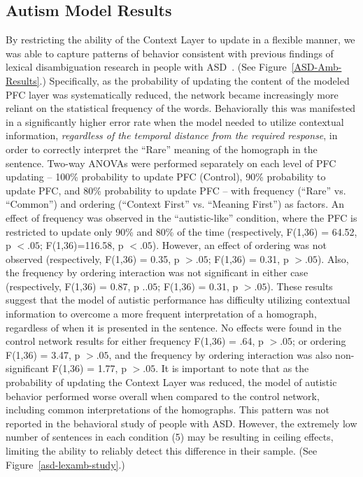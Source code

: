 \documentclass[man]{apa}
\begin{document}
\subsection{Autism Model Results}
By restricting the ability of the Context Layer to update in a flexible manner, we was able to capture patterns of behavior consistent with previous findings of lexical disambiguation research in people with ASD~\cite{RefWorks:103,HappeF:1997:WCC_Homographs}. (See Figure~\ref{ASD-Amb-Results}.) Specifically, as the probability of updating the content of the modeled PFC layer was systematically reduced, the network became increasingly more reliant on the statistical frequency of the words.  Behaviorally this was manifested in a significantly higher error rate when the model needed to utilize contextual information, \emph{regardless of the temporal distance from the required response}, in order to correctly interpret the ``Rare'' meaning of the homograph in the sentence.  Two-way ANOVAs were performed separately on each level of PFC updating  -- 100\% probability to update PFC (Control), 90\% probability to update PFC, and 80\% probability to update PFC -- with frequency (``Rare'' vs. ``Common'') and ordering (``Context First'' vs. ``Meaning First'') as factors.  An effect of frequency was observed in the ``autistic-like'' condition, where the PFC is restricted to update only 90\% and 80\% of the time (respectively, F(1,36) = 64.52, p $< .05$; F(1,36)=116.58, p $< .05$). However, an effect of ordering was not observed (respectively, F(1,36) = 0.35, p $> .05$; F(1,36) = 0.31, p $> .05$). Also, the frequency by ordering interaction was not significant in either case (respectively, F(1,36) = 0.87, p $. .05$; F(1,36) = 0.31, p $> .05$). These results suggest that the model of autistic performance has difficulty utilizing contextual information to overcome a more frequent interpretation of a homograph, regardless of when it is presented in the sentence.  No effects were found in the control network results for either frequency F(1,36) = .64, p $>.05$; or ordering F(1,36) = 3.47, p $>.05$, and the frequency by ordering interaction was also non-significant F(1,36) = 1.77, p $>.05$.  It is important to note that as the probability of updating the Context Layer was reduced, the model of autistic behavior performed worse overall when compared to the control network, including common interpretations of the homographs.   This pattern was not reported in the behavioral study of people with ASD.  However, the extremely low number of sentences in each condition (5) may be resulting in ceiling effects, limiting the ability to reliably detect this difference in their sample. (See Figure~\ref{asd-lexamb-study}.) 
\end{document}
